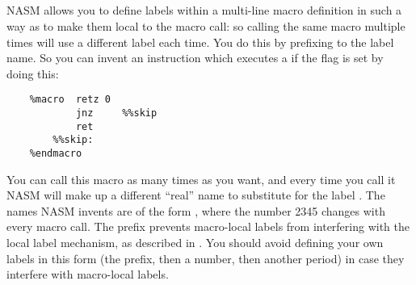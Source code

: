 \subsection{}
\label{subsec:maclocal}

NASM allows you to define labels within a multi-line macro definition
in such a way as to make them local to the macro call: so calling
the same macro multiple times will use a different label each time.
You do this by prefixing \codeindex{\%\%} to the label name.
So you can invent an instruction which executes a  if the
 flag is set by doing this:

\begin{lstlisting}
    %macro  retz 0
            jnz     %%skip
            ret
        %%skip:
    %endmacro
\end{lstlisting}

You can call this macro as many times as you want, and every time
you call it NASM will make up a different ``real'' name to substitute
for the label . The names NASM invents are of the form
, where the number 2345 changes with every macro
call. The  prefix prevents macro-local labels from
interfering with the local label mechanism, as described in
. You should avoid defining your own labels
in this form (the  prefix, then a number, then another period)
in case they interfere with macro-local labels.
